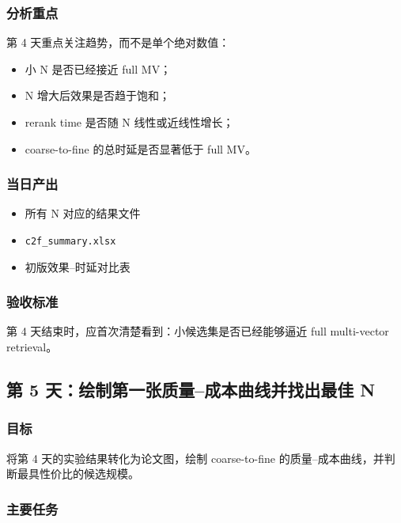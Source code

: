 \documentclass[UTF8,a4paper,12pt]{ctexart}
\begin{document}
	\subsubsection*{分析重点}
	
	第 4 天重点关注趋势，而不是单个绝对数值：
	
	\begin{itemize}[leftmargin=2em]
		\item 小 N 是否已经接近 full MV；
		\item N 增大后效果是否趋于饱和；
		\item rerank time 是否随 N 线性或近线性增长；
		\item coarse-to-fine 的总时延是否显著低于 full MV。
	\end{itemize}
	
	\subsubsection*{当日产出}
	
	\begin{itemize}[leftmargin=2em]
		\item 所有 N 对应的结果文件
		\item \texttt{c2f\_summary.xlsx}
		\item 初版效果--时延对比表
	\end{itemize}
	
	\subsubsection*{验收标准}
	
	第 4 天结束时，应首次清楚看到：小候选集是否已经能够逼近 full multi-vector retrieval。
	
	\subsection{第 5 天：绘制第一张质量--成本曲线并找出最佳 N}
	
	\subsubsection*{目标}
	
	将第 4 天的实验结果转化为论文图，绘制 coarse-to-fine 的质量--成本曲线，并判断最具性价比的候选规模。
	
	\subsubsection*{主要任务}
	
\end{document}
